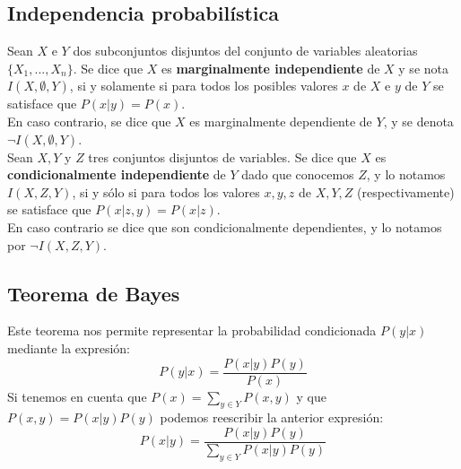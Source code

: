 \documentclass{article}
\theoremstyle{definition_wo_parentheses}
\begin{document}
\subsection{Independencia probabilística}
Sean $X$ e $Y$ dos subconjuntos disjuntos del conjunto de variables aleatorias $\{X_1,...,X_n\}$. Se dice que $X$ es \textbf{marginalmente independiente} de $X$ y se nota $I(X,\emptyset,Y)$, si y solamente si para todos los posibles valores $x$ de $X$ e $y$ de $Y$ se satisface que $P(x|y)=P(x)$.\\
En caso contrario, se dice que $X$ es marginalmente dependiente de $Y$, y se denota $\neg I(X,\emptyset,Y)$.\\

Sean $X, Y$ y $Z$ tres conjuntos disjuntos de variables. Se dice que $X$ es \textbf{condicionalmente independiente} de $Y$ dado que conocemos $Z$, y lo notamos $I(X,Z,Y)$, si y sólo si para todos los valores $x,y,z$ de $X,Y,Z$ (respectivamente) se satisface que $P(x|z,y)=P(x|z)$.\\
En caso contrario se dice que son condicionalmente dependientes, y lo notamos por $\neg I(X,Z,Y)$.

\subsection{Teorema de Bayes}
Este teorema nos permite representar la probabilidad condicionada $P(y|x)$ mediante la expresión:
\[	P(y|x)=\frac{P(x|y)P(y)}{P(x)}	\]
Si tenemos en cuenta que $P(x) = \sum_{y \in Y}P(x,y)$ y que $P(x,y) = P(x|y)P(y)$ podemos reescribir la anterior expresión:
\[	P(x|y) = \frac{P(x|y)P(y)}{\sum_{y \in Y} P(x|y)P(y)}	\]
\end{document}
